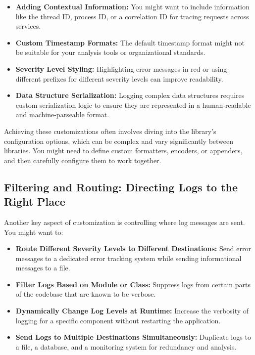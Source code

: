 \documentclass{article}
\begin{document}
{{{{\begin{itemize}
    \item \textbf{Adding Contextual Information:} You might want to include information like the thread ID, process ID, or a correlation ID for tracing requests across services.
    \item \textbf{Custom Timestamp Formats:} The default timestamp format might not be suitable for your analysis tools or organizational standards.
    \item \textbf{Severity Level Styling:} Highlighting error messages in red or using different prefixes for different severity levels can improve readability.
    \item \textbf{Data Structure Serialization:} Logging complex data structures requires custom serialization logic to ensure they are represented in a human-readable and machine-parseable format.
\end{itemize}

Achieving these customizations often involves diving into the library's configuration options, which can be complex and vary significantly between libraries. You might need to define custom formatters, encoders, or appenders, and then carefully configure them to work together.

\subsection*{Filtering and Routing: Directing Logs to the Right Place}

Another key aspect of customization is controlling where log messages are sent. You might want to:

\begin{itemize}
    \item \textbf{Route Different Severity Levels to Different Destinations:} Send error messages to a dedicated error tracking system while sending informational messages to a file.
    \item \textbf{Filter Logs Based on Module or Class:} Suppress logs from certain parts of the codebase that are known to be verbose.
    \item \textbf{Dynamically Change Log Levels at Runtime:} Increase the verbosity of logging for a specific component without restarting the application.
    \item \textbf{Send Logs to Multiple Destinations Simultaneously:} Duplicate logs to a file, a database, and a monitoring system for redundancy and analysis.
\end{itemize}

}}}}
\end{document}
